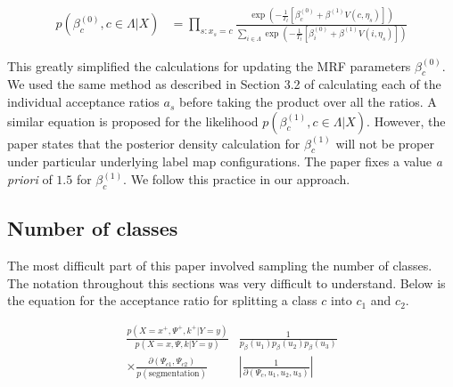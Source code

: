 \documentclass[11pt]{article}
\begin{document}
\begin{equation}
\begin{aligned}
p\left(\beta_{c}^{(0)}, c \in \Lambda | X\right) & = \prod_{s:x_{s} = c}\frac{\exp \left(-\frac{1}{T_{t}}\left[\beta_{c}^{(0)}+\beta^{(1)} V(c, \eta_{s})\right]\right)}{\sum_{i \in \Lambda} \exp \left(-\frac{1}{T_{t}}\left[\beta_{i}^{(0)}+\beta^{(1)} V(i, \eta_{s})\right]\right)}
\end{aligned}
\end{equation}

This greatly simplified the calculations for updating the MRF parameters  $\beta_{c}^{(0)}$.
We used the same method as described in Section 3.2 of calculating each of the individual acceptance ratios $a_{s}$ before taking the product over all the ratios.
A similar equation is proposed for the likelihood $p(\beta_{c}^{(1)}, c \in \Lambda | X)$. However, the paper states that the posterior density calculation for $\beta_{c}^{(1)}$ will not be proper under particular underlying label map configurations.
The paper fixes a value \textit{a priori} of $1.5$ for $\beta_{c}^{(1)}$.
We follow this practice in our approach.

\subsection{Number of classes}
The most difficult part of this paper involved sampling the number of classes.
The notation throughout this sections was very difficult to understand.
Below is the equation for the acceptance ratio for splitting a class $c$ into $c_{1}$ and $c_{2}$.

\begin{equation}\label{acc_prob_num_classes}
\begin{aligned}
\frac{p\left(X=x^{+}, \Psi^{+}, k^{+} | Y=y\right)}{p(X=x, \Psi, k | Y=y)} & \frac{1}{p_{\beta}\left(u_{1}\right) p_{\beta}\left(u_{2}\right) p_{\beta}\left(u_{3}\right)} \\
\times \frac{\partial\left(\Psi_{c 1}, \Psi_{c 2}\right)}{p(\text {segmentation})} &\left|\frac{1}{\partial\left(\Psi_{c}, u_{1}, u_{2}, u_{3}\right)}\right|
\end{aligned}
\end{equation}
\end{document}
